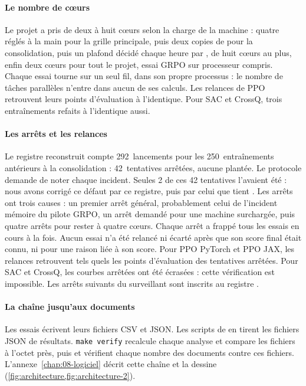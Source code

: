 \paragraph{Le nombre de cœurs}
Le projet a pris de deux à huit cœurs selon la charge de la machine : quatre réglés à la main pour la
grille principale, puis deux copies de  pour la consolidation, puis un plafond décidé
chaque heure par , de huit cœurs au plus, enfin deux cœurs pour tout le projet, essai GRPO
sur processeur compris. Chaque essai tourne sur un seul fil, dans son
propre processus : le nombre de tâches parallèles n'entre dans aucun de ses calculs. Les relances de PPO
retrouvent leurs points d'évaluation à l'identique. Pour SAC et CrossQ, trois entraînements refaits à
l'identique aussi.

\paragraph{Les arrêts et les relances}
Le registre reconstruit  compte 292~lancements pour les
250~entraînements antérieurs à la consolidation : 42~tentatives arrêtées, aucune plantée. Le protocole
demande de noter chaque incident. Seules 2 de ces 42 tentatives l'avaient été : nous avons corrigé ce
défaut par ce registre, puis par celui que tient . Les arrêts ont trois causes : un premier arrêt général, probablement celui de l'incident
mémoire du pilote GRPO, un arrêt demandé pour une machine surchargée, puis quatre arrêts pour
rester à quatre cœurs. Chaque arrêt a frappé tous les essais en cours à la fois. Aucun essai n'a été relancé ni
écarté après que son score final était connu, ni pour une raison liée à son score. Pour PPO PyTorch et PPO
JAX, les relances retrouvent tels quels les points d'évaluation des tentatives arrêtées. Pour SAC et
CrossQ, les courbes arrêtées ont été écrasées : cette vérification est impossible. Les arrêts suivants
du surveillant sont inscrits au registre .

\paragraph{La chaîne jusqu'aux documents}
Les essais écrivent leurs fichiers CSV et JSON. Les scripts de  en tirent les fichiers
JSON de résultats. \texttt{make verify} recalcule chaque analyse et compare les fichiers à l'octet près, puis
 et  vérifient chaque nombre des documents contre
ces fichiers. L'annexe~\ref{chap:08-logiciel} décrit cette chaîne et la dessine (\cref{fig:architecture,fig:architecture-2}).
